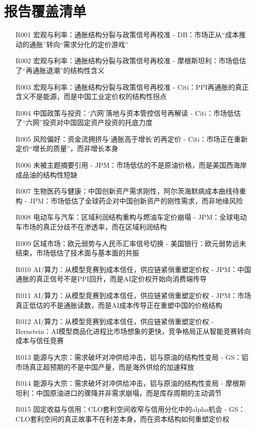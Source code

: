 \documentclass[11pt]{ctexart}
\begin{document}
\section{报告覆盖清单}
\begin{itemize}
  \item [R001] 宏观与利率：通胀结构分裂与政策信号再校准 - DB：市场正从“成本推动的通胀”转向“需求分化的定价游戏”
  \item [R002] 宏观与利率：通胀结构分裂与政策信号再校准 - 摩根斯坦利：市场低估了“再通胀退潮”的结构性含义
  \item [R003] 宏观与利率：通胀结构分裂与政策信号再校准 - Citi：PPI再通胀的真正含义不是能源，而是中国工业定价权的结构性拐点
  \item [R004] 中国政策与投资：‘六网’落地与资本管控信号再解读 - Citi：市场低估了“六网”投资对中国固定资产投资的托底力度
  \item [R005] 风险偏好：资金流拥挤与‘通胀高于增长’的再定价 - Citi：市场正在重新定价“增长的质量”，而非增长本身
  \item [R006] 未被主题摘要引用 - JPM：市场低估的不是原油价格，而是美国西海岸成品油的结构性短缺
  \item [R007] 生物医药与健康：中国创新资产需求刚性，阿尔茨海默病成本曲线待重构 - JPM：市场低估了全球药企对中国创新资产的刚性需求，而非地缘风险
  \item [R008] 电动车与汽车：区域利润结构重构与燃油车定价崩塌 - JPM：全球电动车市场的真正分歧不在渗透率，而在区域利润结构
  \item [R009] 区域市场：欧元弱势与人民币汇率信号切换 - 美国银行：欧元弱势远未结束，市场低估了技术面与基本面的共振
  \item [R010] AI/算力：从模型竞赛到成本信任，供应链紧俏重塑定价权 - JPM：中国通胀的真正信号不是PPI回升，而是AI定价权开始向消费端传导
  \item [R011] AI/算力：从模型竞赛到成本信任，供应链紧俏重塑定价权 - JPM：市场真正低估的不是通胀读数，而是AI成本传导正在重塑中国的价格结构
  \item [R012] AI/算力：从模型竞赛到成本信任，供应链紧俏重塑定价权 - Bernstein：AI模型商品化进程比市场想象的更快，竞争格局正从智能竞赛转向成本与信任竞赛
  \item [R013] 能源与大宗：需求破坏对冲供给冲击，铝与原油的结构性变局 - GS：铝市场真正超预期的不是中国产量，而是海外供给的加速释放
  \item [R014] 能源与大宗：需求破坏对冲供给冲击，铝与原油的结构性变局 - 摩根斯坦利：中国原油进口的骤降并非需求崩塌，而是库存周期的主动调节
  \item [R015] 固定收益与信用：CLO套利空间收窄与信用分化中的alpha机会 - GS：CLO套利空间的真正故事不在利差本身，而在资本结构如何重塑定价权

\end{itemize}
\end{document}
